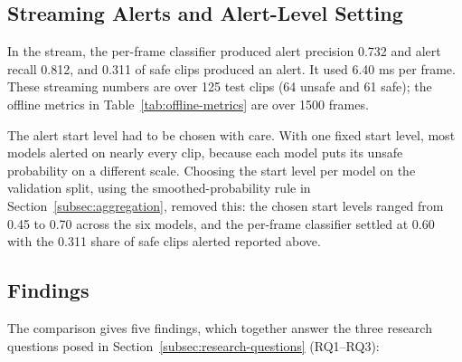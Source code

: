 \documentclass[conference]{IEEEtran}
\begin{document}
\subsection{Streaming Alerts and Alert-Level Setting}
\label{subsec:streaming-alerts}

In the stream, the per-frame classifier produced alert precision 0.732
and alert recall 0.812, and 0.311 of safe clips produced an alert. It
used 6.40 ms per frame. These streaming numbers are over 125 test clips
(64 unsafe and 61 safe); the offline metrics in
Table~\ref{tab:offline-metrics} are over 1500 frames.

The alert start level had to be chosen with care. With one fixed start
level, most models alerted on nearly every clip, because each model puts
its unsafe probability on a different scale. Choosing the start level per
model on the validation split, using the smoothed-probability rule in
Section~\ref{subsec:aggregation}, removed this: the chosen start levels
ranged from 0.45 to 0.70 across the six models, and the per-frame
classifier settled at 0.60 with the 0.311 share of safe clips alerted
reported above.

\subsection{Findings}
\label{subsec:findings}

The comparison gives five findings, which together answer the three
research questions posed in Section~\ref{subsec:research-questions}
(RQ1--RQ3):
\end{document}

